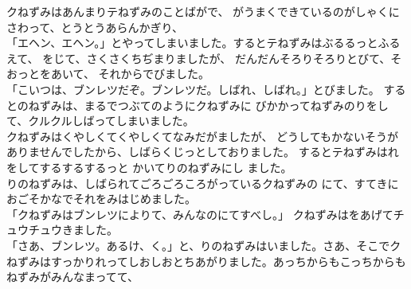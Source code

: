 \documentclass[
a4paper,
10pt,
book]
{tarticle}
\begin{document}
\newpage
\thispagestyle{fancy}
\fancyhead[R]{\empty}
\indent クねずみはあんまりテねずみのことばがで、
がうまくできているのがしゃくにさわって、とうとうあらんかぎり、\\
「エヘン、エヘン。」とやってしまいました。するとテねずみはぶるるっとふるえて、
をじて、さくさくちぢまりましたが、
だんだんそろりそろりとびて、そおっとをあいて、
それからでびました。\\
「こいつは、ブンレツだぞ。ブンレツだ。しばれ、しばれ。」とびました。
するとのねずみは、まるでつぶてのようにクねずみに
びかかってねずみのりをして、クルクルしばってしまいました。\\
\indent クねずみはくやしくてくやしくてなみだがましたが、
どうしてもかないそうがありませんでしたから、しばらくじっとしておりました。
するとテねずみはれをしてするするするっと
かいてりのねずみにし
ました。\\
\indent {}りのねずみは、しばられてごろごろころがっているクねずみの
にて、すてきにおごそかなでそれをみはじめました。\\
「クねずみはブンレツによりて、みんなのにてすべし。」
クねずみはをあげてチュウチュウきました。\\
「さあ、ブンレツ。あるけ、く。」と、りのねずみはいました。さあ、そこでクねずみはすっかりれってしおしおとちあがりました。あっちからもこっちからもねずみがみんなまってて、
\end{document}
